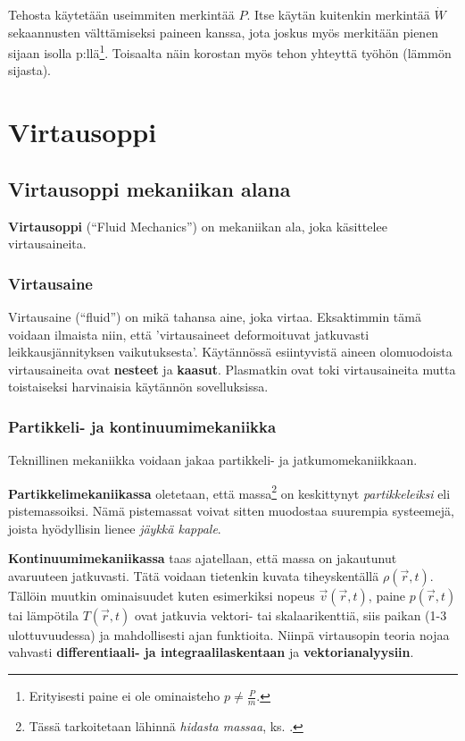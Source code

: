 \documentclass[12pt,a4paper,finnish]{book}
\begin{document}
Tehosta käytetään useimmiten merkintää $P$. Itse käytän kuitenkin merkintää $\dot{W}$ sekaannusten 
välttämiseksi paineen kanssa, jota joskus myös merkitään pienen sijaan isolla p:llä\footnote{
Erityisesti paine ei ole ominaisteho $p \neq \frac{P}{m}$.}. Toisaalta näin 
korostan myös tehon yhteyttä työhön (lämmön sijasta).

\part{Virtausoppi} %

\chapter{Virtausoppi mekaniikan alana}
\textbf{Virtausoppi} (``Fluid Mechanics'') on mekaniikan ala, joka käsittelee virtausaineita.

\section{Virtausaine}

Virtausaine (``fluid'') on mikä tahansa aine, joka virtaa. Eksaktimmin tämä voidaan ilmaista niin, 
että 'virtausaineet deformoituvat jatkuvasti leikkausjännityksen vaikutuksesta'. Käytännössä esiintyvistä 
aineen olomuodoista virtausaineita ovat \textbf{nesteet} ja \textbf{kaasut}. Plasmatkin ovat toki 
virtausaineita mutta toistaiseksi harvinaisia käytännön sovelluksissa.

\section{Partikkeli- ja kontinuumimekaniikka}
Teknillinen mekaniikka voidaan jakaa partikkeli- ja jatkumomekaniikkaan. 

\textbf{Partikkelimekaniikassa} oletetaan, 
että massa\footnote{Tässä tarkoitetaan lähinnä \textit{hidasta massaa}, ks. .} on 
keskittynyt \textit{partikkeleiksi} eli pistemassoiksi. Nämä pistemassat voivat sitten muodostaa 
suurempia systeemejä, joista hyödyllisin lienee \textit{jäykkä kappale}.

\textbf{Kontinuumimekaniikassa} taas ajatellaan, että massa on jakautunut avaruuteen jatkuvasti. 
Tätä voidaan tietenkin kuvata tiheyskentällä \(\rho(\vec{r}, t)\). Tällöin muutkin ominaisuudet kuten 
esimerkiksi nopeus \(\vec{v}(\vec{r}, t)\), paine \(p(\vec{r}, t)\) tai lämpötila \(T(\vec{r}, t)\) 
ovat jatkuvia vektori- tai skalaarikenttiä, siis paikan (1-3 ulottuvuudessa) ja mahdollisesti 
ajan funktioita. Niinpä virtausopin teoria nojaa vahvasti \textbf{differentiaali- ja integraalilaskentaan} 
ja \textbf{vektorianalyysiin}.
\end{document}
